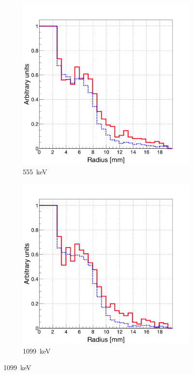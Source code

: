 \begin{figure}
\begin{subfigure}{.5\textwidth}
  \includegraphics[width=.9\linewidth]{03_GraphicFiles/chapter5_SPECTsimu/SPECT/anger/inf_abs/overlap_infAbs_555keV_normMax}
  \caption{555~keV}
  \label{chap5::fig::rad_distr_infAbs_555keV}
\end{subfigure}
\begin{subfigure}{.5\textwidth}
  \centering
  \includegraphics[width=.9\linewidth]{03_GraphicFiles/chapter5_SPECTsimu/SPECT/anger/inf_abs/overlap_infAbs_1099keV_normMax}
  \caption{1099~keV}

\end{subfigure}
\end{figure}
